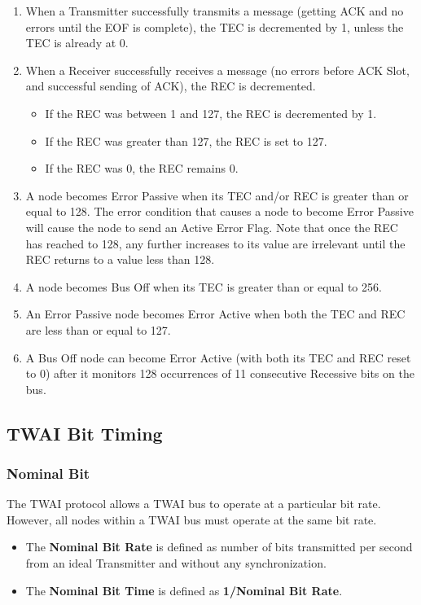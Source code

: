 \documentclass[main\_\_EN.tex]{subfiles}
\begin{document}
\begin{enumerate}
    \item When a Transmitter successfully transmits a message (getting ACK and no errors until the EOF is complete), the TEC is decremented by 1, unless the TEC is already at 0.
    \item When a Receiver successfully receives a message (no errors before ACK Slot, and successful sending of ACK), the REC is decremented.
    \begin{itemize}
        \item If the REC was between 1 and 127, the REC is decremented by 1.
        \item If the REC was greater than 127, the REC is set to 127.
        \item If the REC was 0, the REC remains 0.
    \end{itemize}
    \item A node becomes Error Passive when its TEC and/or REC is greater than or equal to 128. The error condition that causes a node to become Error Passive will cause the node to send an Active Error Flag. Note that once the REC has reached to 128, any further increases to its value are irrelevant until the REC returns to a value less than 128.
    \item A node becomes Bus Off when its TEC is greater than or equal to 256.
    \item An Error Passive node becomes Error Active when both the TEC and REC are less than or equal to 127.
    \item A Bus Off node can become Error Active (with both its TEC and REC reset to 0) after it monitors 128 occurrences of 11 consecutive Recessive bits on the bus.
\end{enumerate}

\subsection{TWAI Bit Timing}
\subsubsection{Nominal Bit}

The TWAI protocol allows a TWAI bus to operate at a particular bit rate. However, all nodes within a TWAI bus must operate at the same bit rate.

\begin{itemize}
    \item The \textbf{Nominal Bit Rate} is defined as number of bits transmitted per second from an ideal Transmitter and without any synchronization.
    \item The \textbf{Nominal Bit Time} is defined as \textbf{1/Nominal Bit Rate}.
\end{itemize}
\end{document}
